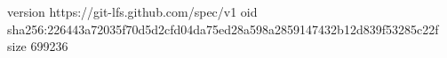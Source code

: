 version https://git-lfs.github.com/spec/v1
oid sha256:226443a72035f70d5d2cfd04da75ed28a598a2859147432b12d839f53285c22f
size 699236
